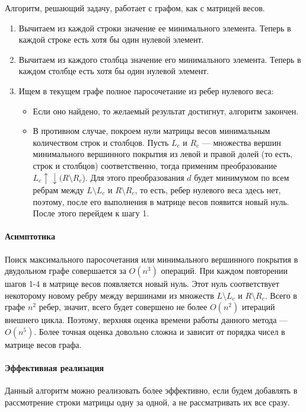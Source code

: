 \documentclass[a4paper,12pt]{article}
\begin{document}
Алгоритм, решающий задачу, работает с графом, как с матрицей весов.
\begin{enumerate}
    \item Вычитаем из каждой строки значение ее минимального элемента. Теперь в каждой строке есть хотя бы один нулевой элемент.
    \item Вычитаем из каждого столбца значение его минимального элемента. Теперь в каждом столбце есть хотя бы один нулевой элемент.
    \item Ищем в текущем графе полное паросочетание из ребер нулевого веса:
    \begin{itemize}
        \item Если оно найдено, то желаемый результат достигнут, алгоритм закончен.
        \item В противном случае, покроем нули матрицы весов минимальным количеством строк и столбцов. Пусть $L_c$ и $R_c$ — множества вершин минимального вершинного покрытия из левой и правой долей (то есть, строк и столбцов) соответственно, тогда применим преобразование $L_c \uparrow\downarrow (R \setminus R_c$). Для этого преобразования $d$ будет минимумом по всем ребрам между $L \setminus L_c$ и $R \setminus R_c$, то есть, ребер нулевого веса здесь нет, поэтому, после его выполнения в матрице весов появится новый нуль. После этого перейдем к шагу 1.
    \end{itemize}
\end{enumerate}
\paragraph{Асимптотика}
Поиск максимального паросочетания или минимального вершинного покрытия в двудольном графе совершается за $O(n^3)$ операций. При каждом повторении шагов 1-4 в матрице весов появляется новый нуль. Этот нуль соответствует некоторому новому ребру между вершинами из множеств $L \setminus L_c$ и $R \setminus R_c$. Всего в графе $n^2$ ребер, значит, всего будет совершено не более $O(n^2)$ итераций внешнего цикла. Поэтому, верхняя оценка времени работы данного метода — $O(n^5)$. Более точная оценка довольно сложна и зависит от порядка чисел в матрице весов графа.

\paragraph{Эффективная реализация}
Данный алгоритм можно реализовать более эффективно, если будем добавлять в рассмотрение строки матрицы одну за одной, а не рассматривать их все сразу.
\end{document}
